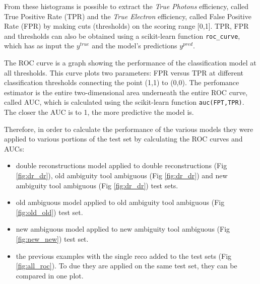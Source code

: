 \documentclass[a4paper, oneside]{book}
\begin{document}
		    From these histograms is possible to extract the \textit{True Photons} efficiency, called True Positive Rate (TPR) 
			and the \textit{True Electron} efficiency, called False Positive Rate (FPR) 
			by making cuts (thresholds) on the scoring range [0,1]. TPR, FPR and thresholds can also be obtained using a scikit-learn function \texttt{roc\_curve}, which has as input the $y^{true}$ and the model's predictions $y^{pred}$. 
			
			The ROC curve is a graph showing the performance of the  classification model at all thresholds. This curve plots two parameters: FPR versus TPR at different classification thresholds connecting the point (1,1) to (0,0). The perfomance estimator is the entire two-dimensional area underneath the entire ROC curve, called AUC, which is calculated using the scikit-learn function \texttt{auc(FPT,TPR)}. The closer the AUC is to 1, the more predictive the model is. 
			
		    Therefore, in order to calculate the performance of the various models they were applied to various portions of the test set by calculating the ROC curves and AUCs:
			\begin{itemize}
				\item double reconstructions model applied to double reconstructions (Fig \ref{fig:dr_dr}), old ambiguity tool ambiguous (Fig \ref{fig:dr_dr}) and new ambiguity tool ambiguous (Fig \ref{fig:dr_dr}) test sets.
				\item old ambiguous model applied to old ambiguity tool ambiguous (Fig \ref{fig:old_old}) test set.
				\item new ambiguous model applied to new ambiguity tool ambiguous (Fig \ref{fig:new_new}) test set.
				\item the previous examples with the single reco added to the test sets (Fig \ref{fig:all_roc}). To due they are applied on the same test set, they can be compared in one plot.
			\end{itemize}
			
\end{document}
